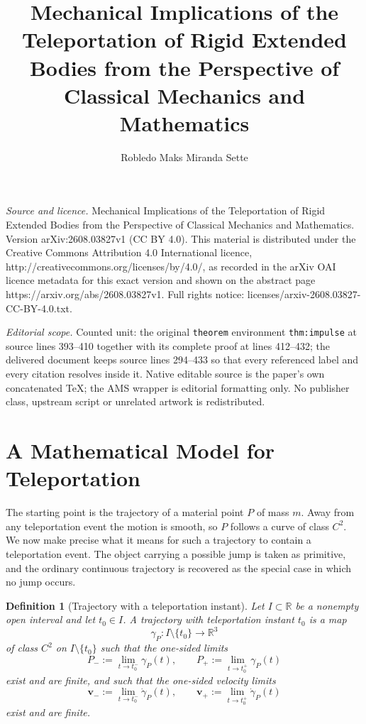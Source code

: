 \documentclass[10pt,a4paper]{amsart}
\newtheorem{definition}{Definition}[section]
\begin{document}
\title[Mechanical Implications of the Teleportation of Rigid Extend]{Mechanical Implications of the Teleportation of Rigid Extended Bodies from the Perspective of Classical Mechanics and Mathematics}
\author{Robledo Maks Miranda Sette}
\date{}
\maketitle
\noindent\emph{Source and licence.} Mechanical Implications of the Teleportation of Rigid Extended Bodies from the Perspective of Classical Mechanics and Mathematics. Version arXiv:2608.03827v1 (CC BY 4.0). This material is distributed under the Creative Commons Attribution 4.0 International licence, http://creativecommons.org/licenses/by/4.0/, as recorded in the arXiv OAI licence metadata for this exact version and shown on the abstract page https://arxiv.org/abs/2608.03827v1. Full rights notice: licenses/arxiv-2608.03827-CC-BY-4.0.txt.\par\smallskip
\noindent\textit{Editorial scope.} Counted unit: the original \texttt{theorem} environment \texttt{thm:impulse} at source lines 393--410 together with its complete proof at lines 412--432; the delivered document keeps source lines 294--433 so that every referenced label and every citation resolves inside it. Native editable source is the paper's own concatenated TeX; the AMS wrapper is editorial formatting only. No publisher class, upstream script or unrelated artwork is redistributed.
	\section{A Mathematical Model for Teleportation}
	\label{sec:model}
	
	The starting point is the trajectory of a material point $P$ of mass
	$m$. Away from any teleportation event the motion is smooth, so $P$
	follows a curve of class $C^2$. We now make precise what it means for
	such a trajectory to contain a teleportation event. The object
	carrying a possible jump is taken as primitive, and the ordinary
	continuous trajectory is recovered as the special case in which no jump
	occurs.
	
	\begin{definition}[Trajectory with a teleportation instant]
		\label{def:traj}
		Let $I\subset\mathbb R$ be a nonempty open interval and let
		$t_0\in I$. A \emph{trajectory with teleportation instant $t_0$} is
		a map
		\[
		\gamma_P:I\setminus\{t_0\}\longrightarrow\mathbb R^3
		\]
		of class $C^2$ on $I\setminus\{t_0\}$ such that the one-sided limits
		\[
		P_{-}:=\lim_{t\to t_0^{-}}\gamma_P(t),
		\qquad
		P_{+}:=\lim_{t\to t_0^{+}}\gamma_P(t)
		\]
		exist and are finite, and such that the one-sided velocity limits
		\[
		\mathbf v_{-}:=\lim_{t\to t_0^{-}}\dot\gamma_P(t),
		\qquad
		\mathbf v_{+}:=\lim_{t\to t_0^{+}}\dot\gamma_P(t)
		\]
		exist and are finite.
	\end{definition}
	
\end{document}
